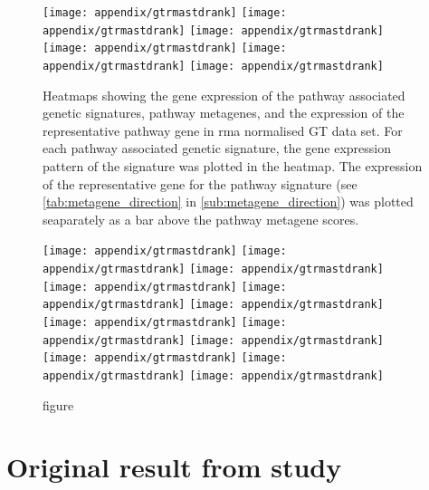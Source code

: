 	\begin{figure}[htp!]
		\centering
		\texttt{[image: appendix/gtrmastdrank]}
		\texttt{[image: appendix/gtrmastdrank]}
		\texttt{[image: appendix/gtrmastdrank]}\\
		\texttt{[image: appendix/gtrmastdrank]}
		\texttt{[image: appendix/gtrmastdrank]}
		\texttt{[image: appendix/gtrmastdrank]}\\
		\caption[]{Heatmaps showing the gene expression of the pathway associated genetic signatures, pathway metagenes, and the expression of the representative pathway gene in \gls{rma} normalised GT data set.
		For each pathway associated genetic signature, the gene expression pattern of the signature was plotted in the heatmap.
		The expression of the representative gene for the pathway signature (see \cref{tab:metagene_direction} in \cref{sub:metagene_direction}) was plotted seaparately as a bar above the pathway metagene scores.
		}
		\label{fig:appendix/gt_meta_rma_mas}
	\end{figure}

	\begin{figure}[htpb]
		\ContinuedFloat
		\captionsetup{list=off,format=cont}
		\centering
		\texttt{[image: appendix/gtrmastdrank]}
		\texttt{[image: appendix/gtrmastdrank]}
		\texttt{[image: appendix/gtrmastdrank]}\\
		\texttt{[image: appendix/gtrmastdrank]}
		\texttt{[image: appendix/gtrmastdrank]}
		\texttt{[image: appendix/gtrmastdrank]}\\
		\texttt{[image: appendix/gtrmastdrank]}
		\texttt{[image: appendix/gtrmastdrank]}
		\texttt{[image: appendix/gtrmastdrank]}\\
		\texttt{[image: appendix/gtrmastdrank]}
		\texttt{[image: appendix/gtrmastdrank]}
		\texttt{[image: appendix/gtrmastdrank]}\\
		\caption[]{figure}
	\end{figure}

	\newpage

	\section{Original result from \citet{Gatza2010a} study}
	\label{sec:result_from_gatza2010a_study}

